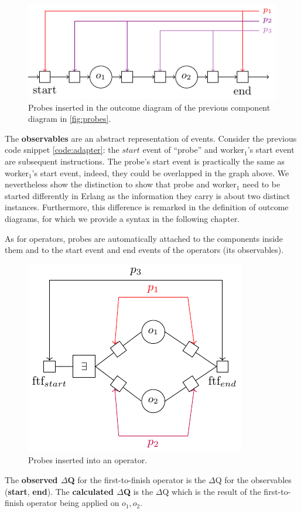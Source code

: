         \begin{figure}[H]
            \begin{center}
                \includegraphics[scale=1.3]{tikz/probe_1.pdf}
            \end{center}
            \label{fig:probes_o}
            \caption{Probes inserted in the outcome diagram of the previous component diagram in \cref{fig:probes}.}
        \end{figure}
       
    The \textbf{observables} are an abstract representation of events. Consider the previous code snippet \cref{code:adapter}: the $start$ event of ``probe'' and worker$_1$'s start event are subsequent instructions. The probe's start event is practically the same as worker$_1$'s start event, indeed, they could be overlapped in the graph above. We nevertheless show the distinction to show that probe and worker$_1$ need to be started differently in Erlang as the information they carry is about two distinct instances. Furthermore, this difference is remarked in the definition of outcome diagrams, for which we provide a syntax in the following chapter. 
    
    As for operators, probes are automatically attached to the components inside them and to the start event and end events of the operators (its observables). 

       \begin{figure}[H]
           \begin{center}
                \includegraphics[scale = 1.3]{tikz/probe_2.pdf}
            \end{center}
            \label{fig:probes_op}
            \caption{Probes inserted into an operator.}
       \end{figure}
    
    The \textbf{observed $\Delta$Q} for the first-to-finish operator is the $\Delta$Q for the observables (\textbf{start}, \textbf{end}). The \textbf{calculated $\Delta$Q} is the $\Delta$Q which is the result of the first-to-finish operator being applied on $o_1, o_2$.

        


